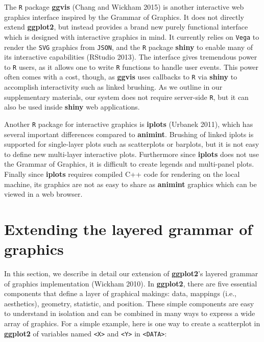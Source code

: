 \documentclass[12pt,]{article}
\theoremstyle{definition}
\theoremstyle{definition}
\theoremstyle{definition}
\theoremstyle{remark}
\begin{document}
The \texttt{R} package \textbf{ggvis} (Chang and Wickham 2015) is
another interactive web graphics interface inspired by the Grammar of
Graphics. It does not directly extend \textbf{ggplot2}, but instead
provides a brand new purely functional interface which is designed with
interactive graphics in mind. It currently relies on \texttt{Vega} to
render the \texttt{SVG} graphics from \texttt{JSON}, and the \texttt{R}
package \textbf{shiny} to enable many of its interactive capabilities
(RStudio 2013). The interface gives tremendous power to \texttt{R}
users, as it allows one to write \texttt{R} functions to handle user
events. This power often comes with a cost, though, as \textbf{ggvis}
uses callbacks to \texttt{R} via \textbf{shiny} to accomplish
interactivity such as linked brushing. As we outline in our
supplementary materials, our system does not require server-side
\texttt{R}, but it can also be used inside \textbf{shiny} web
applications.

Another \texttt{R} package for interactive graphics is \textbf{iplots}
(Urbanek 2011), which has several important differences compared to
\textbf{animint}. Brushing of linked iplots is supported for
single-layer plots such as scatterplots or barplots, but it is not easy
to define new multi-layer interactive plots. Furthermore since
\textbf{iplots} does not use the Grammar of Graphics, it is difficult to
create legends and multi-panel plots. Finally since \textbf{iplots}
requires compiled C++ code for rendering on the local machine, its
graphics are not as easy to share as \textbf{animint} graphics which can
be viewed in a web browser.

\hypertarget{extending-the-layered-grammar-of-graphics}{%
\section{Extending the layered grammar of
graphics}\label{extending-the-layered-grammar-of-graphics}}

In this section, we describe in detail our extension of
\textbf{ggplot2}'s layered grammar of graphics implementation (Wickham
2010). In \textbf{ggplot2}, there are five essential components that
define a layer of graphical makings: data, mappings (i.e., aesthetics),
geometry, statistic, and position. These simple components are easy to
understand in isolation and can be combined in many ways to express a
wide array of graphics. For a simple example, here is one way to create
a scatterplot in \textbf{ggplot2} of variables named
\texttt{\textless{}X\textgreater{}} and
\texttt{\textless{}Y\textgreater{}} in
\texttt{\textless{}DATA\textgreater{}}:
\end{document}
